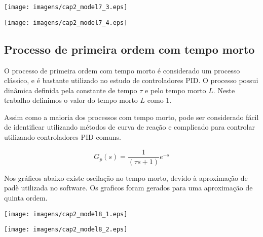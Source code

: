     \begin{center}
        \texttt{[image: imagens/cap2\_model7\_3.eps]}
        \label{cap2_13}
    \end{center}
    
    \begin{center}
        \texttt{[image: imagens/cap2\_model7\_4.eps]}
        \label{cap2_14}
    \end{center}

\subsection{Processo de primeira ordem com tempo morto}

    O processo de primeira ordem com tempo morto é considerado um processo
    clássico, e é bastante utilizado no estudo de controladores \acs{PID}. O
    processo possui dinâmica definida pela constante de tempo $\tau$ e pelo
    tempo morto $L$. Neste trabalho definimos o valor do tempo morto $L$ como 1.
    
    Assim como a maioria dos processos com tempo morto, pode ser considerado
    fácil de identificar utilizando métodos de curva de reação e complicado para
    controlar utilizando controladores \acs{PID} comuns.

    \begin{equation}
        G_p(s) = \frac{1}{(\tau s +1)}e^{-s}
    \end{equation}
    
    Nos gráficos abaixo existe oscilação no tempo morto, devido à aproximação de
    padè utilizada no software. Os graficos foram gerados para uma aproximação
    de quinta ordem.

    \begin{center}
        \texttt{[image: imagens/cap2\_model8\_1.eps]}
    \end{center}

    \begin{center}
        \texttt{[image: imagens/cap2\_model8\_2.eps]}
    \end{center}
    

